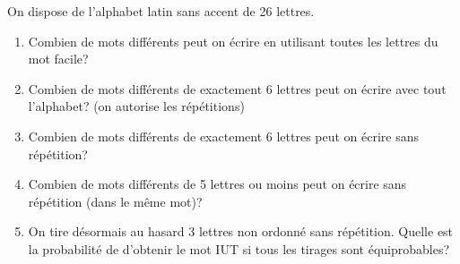 \documentclass[a4paper]{article}
\newif\ifcorrection
\begin{document}
\exost
On dispose de l'alphabet latin sans accent de 26 lettres.
\begin{enumerate}
 \item Combien de mots diff\'erents peut on \'ecrire en utilisant toutes les lettres du mot \og{}facile\fg{}?
   \ifcorrection
 \textcolor{red}{
 ``Facile'' s'\'ecrit avec 6 lettres, donc il existe $P_6=6!=720$ permutations possibles.
 }
 \fi
 \item Combien de mots diff\'erents de exactement 6 lettres peut on \'ecrire avec tout l'alphabet? (on autorise les r\'ep\'etitions)
   \ifcorrection
 \textcolor{red}{
 On consid\`ere un tirage ordonn\'e de 6 \'el\'ements avec remise, soit $26^6 = 308~915~776$ mots possibles.
 }
 \fi
 \item Combien de mots diff\'erents de exactement 6 lettres peut on \'ecrire sans r\'ep\'etition?
   \ifcorrection
 \textcolor{red}{
 On consid\`ere un tirage ordonn\'e de 6 \'el\'ements sans remise, soit $A_{26}^6 = \frac{26!}{(26-6)!} = 165~765~600$ mots possibles.
 }
 \fi
 \item Combien de mots diff\'erents de 5 lettres ou moins peut on \'ecrire sans r\'ep\'etition (dans le m\^eme mot)?
   \ifcorrection
 \textcolor{red}{
 On consid\`ere la somme de tous les tirages ordonn\'es de 5 \'el\'ements ou moins sans remise, soit $A_{26}^1 + A_{26}^2 + A_{26}^3 + A_{26}^4 + A_{26}^5 = 26 + 26\times 25 + 26\times 25\times 24 + 26\times 25\times 24\times 23 + A_{26}^5 = 8~268~676$ mots possibles.
 }
 \fi
 \item On tire d\'esormais au hasard 3 lettres non ordonn\'e sans r\'ep\'etition. Quelle est la probabilit\'e de d'obtenir le mot \og{}IUT\fg{} si tous les tirages sont \'equiprobables?
  \ifcorrection
  \textcolor{red}{
   On consid\`ere le nombre d'arrangements de 3 lettres parmi 26 lettres: $\card{\Omega}=A_{26}^3=\frac{26!}{(26-3)!} = 15~600$.\\
   Si on note $A$ l'\'ev\'enement $\{\text{``obtenir le mot IUT''} \}$, alors $P(A) = \frac{1}{15~600}$
  }
  \fi
\end{enumerate}
\end{document}
